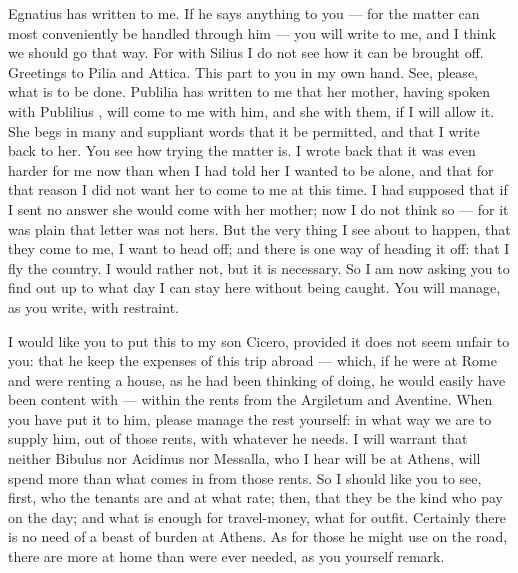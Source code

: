 

 Egnatius has written to me. If he says anything to you --- for the matter can most conveniently be handled through him --- you will write to me, and I think we should go that way. For with Silius I do not see how it can be brought off. Greetings to Pilia and Attica. This part to you in my own hand. See, please, what is to be done. Publilia has written to me that her mother, \dag having spoken with Publilius \dag, will come to me with him, and she with them, if I will allow it. She begs in many and suppliant words that it be permitted, and that I write back to her. You see how trying the matter is. I wrote back that it was even harder for me now than when I had told her I wanted to be alone, and that for that reason I did not want her to come to me at this time. I had supposed that if I sent no answer she would come with her mother; now I do not think so --- for it was plain that letter was not hers. But the very thing I see about to happen, that they come to me, I want to head off; and there is one way of heading it off: that I fly the country. I would rather not, but it is necessary. So I am now asking you to find out up to what day I can stay here without being caught. You will manage, as you write, with restraint.

 I would like you to put this to my son Cicero, provided it does not seem unfair to you: that he keep the expenses of this trip abroad --- which, if he were at Rome and were renting a house, as he had been thinking of doing, he would easily have been content with --- within the rents from the Argiletum and Aventine. When you have put it to him, please manage the rest yourself: in what way we are to supply him, out of those rents, with whatever he needs. I will warrant that neither Bibulus nor Acidinus nor Messalla, who I hear will be at Athens, will spend more than what comes in from those rents. So I should like you to see, first, who the tenants are and at what rate; then, that they be the kind who pay on the day; and what is enough for travel-money, what for outfit. Certainly there is no need of a beast of burden at Athens. As for those he might use on the road, there are more at home than were ever needed, as you yourself remark.
